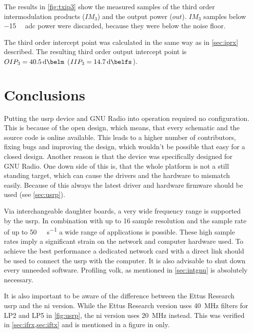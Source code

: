 \documentclass[12pt,a4paper,parskip=full,abstracton]{scrartcl}
\begin{document}
The results in \cref{fig:txip3} show the measured samples of the third order
intermodulation products ($IM_3$) and the output power ($out$). $IM_3$ samples
below \SI{-15}{\deci\belfs} \gls{adc} power were discarded, because they were
below the noise floor.

The third order intercept point was calculated in the same way as in \cref{sec:iprx}
described. The resulting third order output intercept point is $OIP_3 = \SI{40.5}{\deci\belm}$
($IIP_3 = \SI{14.7}{\deci\belfs}$).

\clearpage
\section{Conclusions}

Putting the \gls{usrp} device and GNU Radio into operation required no configuration.
This is because of the open design, which means, that every schematic and the source code is online
available. This leads to a higher number of contributors, fixing bugs
and improving the design, which wouldn't be possible that easy for a closed design. Another
reason is that the device was specifically designed for GNU Radio. One down side
of this is, that the whole platform is not a still standing target, which can cause
the drivers and the hardware to mismatch easily. Because of this always the latest
driver and hardware firmware should be used (see \cref{sec:usrp}).

Via interchangeable daughter boards, a very wide frequency range is supported by
the \gls{usrp}. In combination with up to \SI{16}{\bit} sample resolution and the
sample rate of up to \SI{50}{\mega\samples\per\second} a wide range of applications
is possible. These high sample rates imply a significant strain on the network
and computer hardware used. To achieve the best performance a dedicated network
card with a direct link should be used to connect the \gls{usrp} with the computer.
It is also advisable to shut down every unneeded software. Profiling \gls{volk},
as mentioned in \cref{sec:intgnu} is absolutely necessary.

It is also important to be aware of the difference between the Ettus Research
\gls{usrp} and the \gls{ni} version. While the Ettus Research version uses
\SI{40}{\mega\hertz} filters for LP2 and LP5 in \cref{fig:usrp}, the \gls{ni}
version uses \SI{20}{\mega\hertz} instead. This was verified in
\cref{sec:ifrx,sec:iftx} and is mentioned in a figure in \cite{ni_29xx} only.
\end{document}
